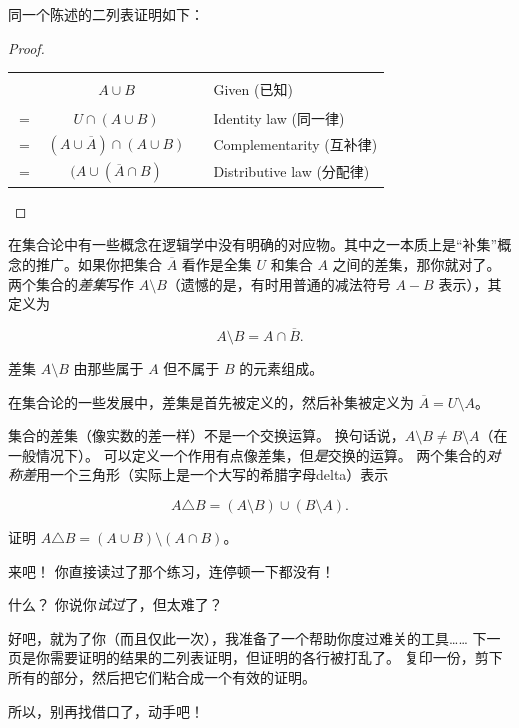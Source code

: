 同一个陈述的二列表证明如下：

\begin{proof}

\begin{tabular}{cccl}
  & $A \cup B$ & \rule{36pt}{0pt} & Given (已知) \\
$=$ & $U \cap (A \cup B)$ & & Identity law (同一律) \\
$=$ & $(A \cup \overline{A}) \cap (A \cup B)$ & & Complementarity (互补律) \\
$=$ & $(A \cup (\overline{A} \cap B)$ & & Distributive law (分配律)\\
\end{tabular}

\end{proof}

在集合论中有一些概念在逻辑学中没有明确的对应物。其中之一本质上是“补集”概念的推广。如果你把集合 $\overline{A}$ 看作是全集 $U$ 和集合 $A$ 之间的差集，那你就对了。两个集合的\emph{差集}写作 $A \setminus B$（遗憾的是，有时用普通的减法符号 $A-B$ 表示），其定义为

\[   A \setminus B = A \cap \overline{B}. \]

\noindent 差集 $A \setminus B$ 由那些属于 $A$ 但不属于 $B$ 的元素组成。

在集合论的一些发展中，差集是首先被定义的，然后补集被定义为 $\overline{A} = U \setminus A$。

集合的差集（像实数的差一样）不是一个交换运算。
换句话说，$A \setminus B \neq B \setminus A$（在一般情况下）。
可以定义一个作用有点像差集，但\emph{是}交换的运算。
两个集合的\emph{对称差}用一个三角形（实际上是一个大写的希腊字母delta）表示

\[ A \triangle B = (A \setminus B) \cup (B\setminus A).
\]

\begin{exer}
证明 $A \triangle B = (A \cup B) \setminus (A \cap B)$。
\end{exer}

来吧！
你直接读过了那个练习，连停顿一下都没有！

什么？
你说你\emph{试过}了，但太难了？

好吧，就为了你（而且仅此一次），我准备了一个帮助你度过难关的工具……
下一页是你需要证明的结果的二列表证明，但证明的各行被打乱了。
复印一份，剪下所有的部分，然后把它们粘合成一个有效的证明。

所以，别再找借口了，动手吧！

\newpage




